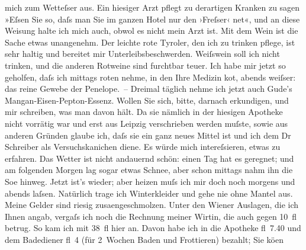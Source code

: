 \begin{ledgroupsized}[t]{13cm}
               mich zum Wetteſser aus. Ein hiesiger Arzt pflegt zu derartigen Kranken zu sagen
               »Eſsen Sie so, daſs man Sie im ganzen Hotel nur den ›Freſser‹ ne{\geminationn}t«, und an diese Weisung halte ich mich auch, obwol es
               nicht mein Arzt ist. Mit dem Wein ist die Sache etwas unangenehm. {\pb}Der leichte rote Tyroler, den ich zu trinken pflege,
               ist sehr \label{K_L00181-1v}\label{K_L00181-1h}haltig und
               bereitet mir Unterleibsbeschwerden. Weiſswein soll ich nicht trinken, und die anderen
               Rotweine sind furchtbar teuer. Ich habe mir jetzt so geholfen, daſs ich mittags roten
               nehme, in den Ihre Medizin ko{\geminationm}t, abends weiſser: das
               reine Gewebe der Penelope. – Dreimal täglich nehme ich jetzt auch Gude’s Mangan-Eisen-Pepton-Essenz. Wollen Sie sich, bitte, darnach
               erkundigen, und mir schreiben, was man davon hält. Da sie nämlich in der hiesigen
               Apotheke nicht vorrätig war und erst aus Leipzig
               verschrieben werden muſste, sowie aus anderen Gründen glaube ich, daſs sie ein ganz
               neues Mittel ist und ich dem Dr Schreiber als
               Versuchskanichen diene. Es würde mich intereſsieren, etwas zu erfahren.\pend
           \pstart
           Das Wetter ist nicht andauernd schön: einen Tag hat es geregnet; und am folgenden
               Morgen lag sogar etwas Schnee, aber schon mittags nahm ihn die So{\geminationn}e hinweg. Jetzt ist’s wieder; aber heizen muſs ich mir
               doch noch morgens und abends laſsen. Natürlich trage ich Winterkleider und gehe nie
               ohne Mantel aus.\pend
           \pstart
           Meine Gelder sind riesig zusa{\geminationm}engeschmolzen. Unter den
                  Wiener Auslagen, die ich Ihnen angab, vergaſs
                  {\pb}ich noch die Rechnung meiner Wirtin, die auch gegen 10 fl betrug. So kam
               ich mit 38 fl hier an. Davon habe ich in die Apotheke fl 7.40 und dem Badediener fl 4
               (für 2 Wochen Baden und Frottieren) bezahlt; Sie kö{\geminationn}en

\end{ledgroupsized}
